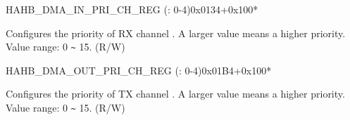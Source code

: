 \begin{register}{H}{AHB\_DMA\_IN\_PRI\_CH\_REG (: 0-4)}{0x0134+0x100*}\label{regdesc:AHBDMAINPRICHNREG}
%
%
\regnewline%
\begin{regdesc}\begin{reglist}
\label{fielddesc:AHBDMARXPRICHN}\item [AHB\_DMA\_RX\_PRI\_CH\regindex{n}] Configures the priority of RX channel . A larger value means a higher priority. Value range: 0 \verb+~+ 15. (R/W)
\end{reglist}\end{regdesc}
\end{register}


\begin{register}{H}{AHB\_DMA\_OUT\_PRI\_CH\_REG (: 0-4)}{0x01B4+0x100*}\label{regdesc:AHBDMAOUTPRICHNREG}
%
%
\regnewline%
\begin{regdesc}\begin{reglist}
\label{fielddesc:AHBDMATXPRICHN}\item [AHB\_DMA\_TX\_PRI\_CH\regindex{n}] Configures the priority of TX channel . A larger value means a higher priority. Value range: 0 \verb+~+ 15. (R/W)
\end{reglist}\end{regdesc}
\end{register}


